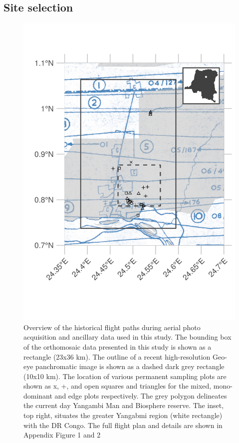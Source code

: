 \documentclass[remote sensing,article,submit,moreauthors,pdftex]{mdpi}
\begin{document}
\hypertarget{site-selection}{%
\subsection{Site selection}\label{site-selection}}

\begin{figure}

{\centering \includegraphics[width=0.75\linewidth]{./figures/flight_paths} 

}

\caption{Overview of the historical flight paths during aerial photo acquisition and ancillary data used in this study. The bounding box of the orthomosaic data presented in this study is shown as a rectangle (23x36 km). The outline of a recent high-resolution Geo-eye panchromatic image is shown as a dashed dark grey rectangle (10x10 km). The location of various permanent sampling plots are shown as x, +, and open squares and triangles for the mixed, mono-dominant and edge plots respectively. The grey polygon delineates the current day Yangambi Man and Biosphere reserve. The inset, top right, situates the greater Yangabmi region (white rectangle) with the DR Congo. The full flight plan and details are shown in Appendix Figure 1 and 2}\label{fig:unnamed-chunk-2}
\end{figure}
\end{document}
